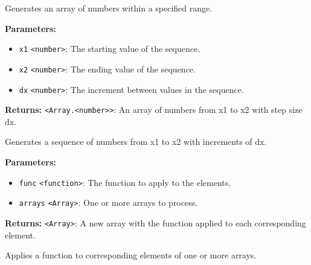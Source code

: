 \documentclass[12pt,a4paper]{article}
\begin{document}
\noindent Generates an array of numbers within a specified range.

\vspace{5mm}
\noindent {}


\noindent \textbf{Parameters:}
\begin{itemize}
  \item \texttt{x1} \texttt{<number>}: The starting value of the sequence.
  \item \texttt{x2} \texttt{<number>}: The ending value of the sequence.
  \item \texttt{dx} \texttt{<number>}: The increment between values in the sequence.
\end{itemize}

\noindent \textbf{Returns:} \texttt{<Array.<number>>}: An array of numbers from \textasciigrave{}x1\textasciigrave{} to \textasciigrave{}x2\textasciigrave{} with step size \textasciigrave{}dx\textasciigrave{}.

\noindent Generates a sequence of numbers from \textasciigrave{}x1\textasciigrave{} to \textasciigrave{}x2\textasciigrave{} with increments of \textasciigrave{}dx\textasciigrave{}.

\vspace{5mm}
\noindent {}


\noindent \textbf{Parameters:}
\begin{itemize}
  \item \texttt{func} \texttt{<function>}: The function to apply to the elements.
  \item \texttt{arrays} \texttt{<Array>}: One or more arrays to process.
\end{itemize}

\noindent \textbf{Returns:} \texttt{<Array>}: A new array with the function applied to each corresponding element.

\noindent Applies a function to corresponding elements of one or more arrays.

\vspace{5mm}
\noindent {}
\end{document}
